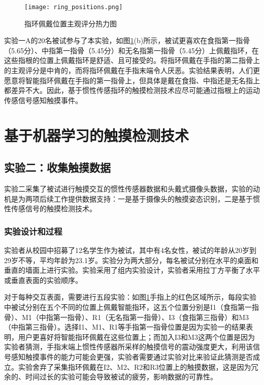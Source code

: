 \begin{figure}
	\centering
	\texttt{[image: ring\_positions.png]}
	\caption*{图a展示了实验所评测的九种不同的指环佩戴位置，实验者为每个位置定义了缩写，例如，I1表示食指的第一指骨；图b是被试对不同指环佩戴位置的喜好程度（1 - 完全不喜欢，7 - 非常喜欢）}
	\caption{指环佩戴位置主观评分热力图}
	\label{fig:ring_positions}
\end{figure}

实验一A的20名被试参与了本实验，如图\ref{fig:ring_positions}(b)所示，被试更喜欢在食指第一指骨（5.65分）、中指第一指骨（5.45分）和无名指第一指骨（5.45分）上佩戴指环，在这些指根的位置上佩戴指环是舒适、且可接受的。将指环佩戴在手指的第二指骨上的主观评分是中肯的，而将指环佩戴在手指末端令人厌恶。实验结果表明，人们更愿意将智能指环佩戴在手指的第一指骨上，但具体是戴在食指、中指还是无名指上都差异不大。因此，基于惯性传感指环的触摸检测技术应尽可能通过指根上的运动传感信号感知触摸事件。

\section{基于机器学习的触摸检测技术}

\subsection{实验二：收集触摸数据}

实验二采集了被试进行触摸交互的惯性传感器数据和头戴式摄像头数据，实验的动机是为两项后续工作提供数据支持：一是基于摄像头的触摸姿态识别，二是基于惯性传感信号的触摸检测技术。

\subsubsection{实验设计和过程}

实验者从校园中招募了12名学生作为被试，其中有4名女性，被试的年龄从20岁到29岁不等，平均年龄为23.1岁。实验分为两大部分，每名被试分别在水平的桌面和垂直的墙面上进行实验。实验采用了组内实验设计，实验者采用拉丁方平衡了水平或垂直表面的实验顺序。

对于每种交互表面，需要进行五段实验：如图\ref{fig:ring_positions}手指上的红色区域所示，每段实验中被试分别在五个不同的位置上佩戴智能指环，这五个位置分别是I1（食指第一指骨）、M1（中指第一指骨）、R1（无名指第一指骨）、I3（食指第三指骨）和M3（中指第三指骨）。选择I1、M1、R1等手指第一指骨位置是因为实验一的结果表明，用户更喜好将智能指环佩戴在这些位置上；而加入I3和M3这两个位置是因为实验者猜测，手指末端上惯性传感器所采样的触摸信号的震动强度更大，利用该信号感知触摸事件的能力可能会更强，实验者需要通过实验对比来验证此猜测是否成立。实验舍弃了采集指环佩戴在I2、M2、R2和R3位置上的触摸数据，这是因为冗余的、时间过长的实验可能会导致被试的疲劳，影响数据的可靠性。

